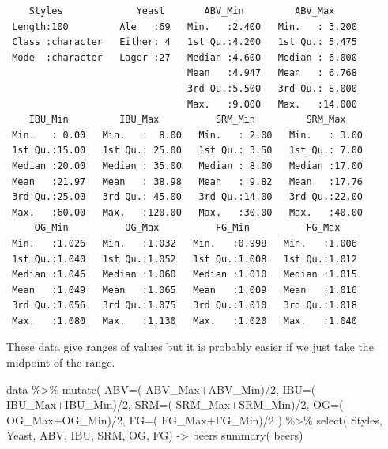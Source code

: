 \documentclass[
  letterpaper,
]{book}
\newenvironment{Shaded}{\begin{snugshade}}{\end{snugshade}}
\newcommand{\AttributeTok}[1]{\textcolor[rgb]{0.40,0.45,0.13}{#1}}
\newcommand{\DecValTok}[1]{\textcolor[rgb]{0.68,0.00,0.00}{#1}}
\newcommand{\FunctionTok}[1]{\textcolor[rgb]{0.28,0.35,0.67}{#1}}
\newcommand{\NormalTok}[1]{\textcolor[rgb]{0.00,0.23,0.31}{#1}}
\newcommand{\OtherTok}[1]{\textcolor[rgb]{0.00,0.23,0.31}{#1}}
\newcommand{\SpecialCharTok}[1]{\textcolor[rgb]{0.37,0.37,0.37}{#1}}
\begin{document}
\begin{verbatim}
    Styles             Yeast       ABV_Min         ABV_Max      
 Length:100         Ale   :69   Min.   :2.400   Min.   : 3.200  
 Class :character   Either: 4   1st Qu.:4.200   1st Qu.: 5.475  
 Mode  :character   Lager :27   Median :4.600   Median : 6.000  
                                Mean   :4.947   Mean   : 6.768  
                                3rd Qu.:5.500   3rd Qu.: 8.000  
                                Max.   :9.000   Max.   :14.000  
    IBU_Min         IBU_Max          SRM_Min         SRM_Max     
 Min.   : 0.00   Min.   :  8.00   Min.   : 2.00   Min.   : 3.00  
 1st Qu.:15.00   1st Qu.: 25.00   1st Qu.: 3.50   1st Qu.: 7.00  
 Median :20.00   Median : 35.00   Median : 8.00   Median :17.00  
 Mean   :21.97   Mean   : 38.98   Mean   : 9.82   Mean   :17.76  
 3rd Qu.:25.00   3rd Qu.: 45.00   3rd Qu.:14.00   3rd Qu.:22.00  
 Max.   :60.00   Max.   :120.00   Max.   :30.00   Max.   :40.00  
     OG_Min          OG_Max          FG_Min          FG_Max     
 Min.   :1.026   Min.   :1.032   Min.   :0.998   Min.   :1.006  
 1st Qu.:1.040   1st Qu.:1.052   1st Qu.:1.008   1st Qu.:1.012  
 Median :1.046   Median :1.060   Median :1.010   Median :1.015  
 Mean   :1.049   Mean   :1.065   Mean   :1.009   Mean   :1.016  
 3rd Qu.:1.056   3rd Qu.:1.075   3rd Qu.:1.010   3rd Qu.:1.018  
 Max.   :1.080   Max.   :1.130   Max.   :1.020   Max.   :1.040  
\end{verbatim}

These data give ranges of values but it is probably easier if we just
take the midpoint of the range.

\begin{Shaded}
\begin{Highlighting}[]
\NormalTok{data }\SpecialCharTok{\%\textgreater{}\%}
  \FunctionTok{mutate}\NormalTok{( }\AttributeTok{ABV=}\NormalTok{( ABV\_Max}\SpecialCharTok{+}\NormalTok{ABV\_Min)}\SpecialCharTok{/}\DecValTok{2}\NormalTok{,}
          \AttributeTok{IBU=}\NormalTok{( IBU\_Max}\SpecialCharTok{+}\NormalTok{IBU\_Min)}\SpecialCharTok{/}\DecValTok{2}\NormalTok{,}
          \AttributeTok{SRM=}\NormalTok{( SRM\_Max}\SpecialCharTok{+}\NormalTok{SRM\_Min)}\SpecialCharTok{/}\DecValTok{2}\NormalTok{,}
          \AttributeTok{OG=}\NormalTok{( OG\_Max}\SpecialCharTok{+}\NormalTok{OG\_Min)}\SpecialCharTok{/}\DecValTok{2}\NormalTok{,}
          \AttributeTok{FG=}\NormalTok{( FG\_Max}\SpecialCharTok{+}\NormalTok{FG\_Min)}\SpecialCharTok{/}\DecValTok{2}\NormalTok{ )  }\SpecialCharTok{\%\textgreater{}\%}
  \FunctionTok{select}\NormalTok{( Styles, Yeast, ABV, IBU, SRM, OG, FG) }\OtherTok{{-}\textgreater{}}\NormalTok{ beers}
\FunctionTok{summary}\NormalTok{( beers)}
\end{Highlighting}
\end{Shaded}
\end{document}
